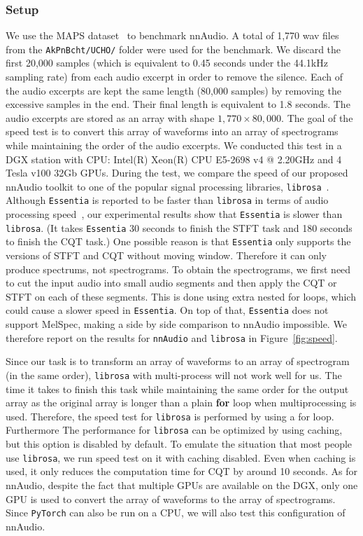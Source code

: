 \documentclass{ieeeaccess}
\newcommand{\nbh}[1]{\texttt{#1}}
\begin{document}
\subsubsection{Setup}
We use the MAPS dataset~\cite{emiya2010maps} to benchmark nnAudio. A total of 1,770 wav files from the \nbh{AkPnBcht/UCHO/} folder were used for the benchmark. We discard the first 20,000 samples (which is equivalent to 0.45 seconds under the 44.1kHz sampling rate) from each audio excerpt in order to remove the silence. Each of the audio excerpts are kept the same length (80,000 samples) by removing the excessive samples in the end. Their final length is equivalent to 1.8 seconds. The audio excerpts are stored as an array with shape $1,770 \times 80,000$. The goal of the speed test is to convert this array of waveforms into an array of spectrograms while maintaining the order of the audio excerpts. We conducted this test in a DGX station with CPU: Intel(R) Xeon(R) CPU E5-2698 v4 @ 2.20GHz and 4 Tesla v100 32Gb GPUs. During the test, we compare the speed of our proposed nnAudio toolkit to one of the popular signal processing libraries, \nbh{librosa}~\cite{mcfee2015Librosa}. Although \nbh{Essentia} is reported to be faster than \nbh{librosa} in terms of audio processing speed~\cite{moffat2015evaluation}, our experimental results show that \nbh{Essentia} is slower than \nbh{librosa}. (It takes \nbh{Essentia} 30 seconds to finish the STFT task and 180 seconds to finish the CQT task.) One possible reason is that \nbh{Essentia} only supports the versions of STFT and CQT without moving window. Therefore it can only produce spectrums, not spectrograms. To obtain the spectrograms, we first need to cut the input audio into small audio segments and then apply the CQT or STFT on each of these segments. This is done using extra nested for loops, which could cause a slower speed in \nbh{Essentia}. On top of that, \nbh{Essentia} does not support MelSpec, making a side by side comparison to nnAudio impossible. We therefore report on the results for \nbh{nnAudio} and \nbh{librosa} in Figure~\ref{fig:speed}.

Since our task is to transform an array of waveforms to an array of spectrogram (in the same order), \nbh{librosa} with multi-process will not work well for us. The time it takes to finish this task while maintaining the same order for the output array as the original array is longer than a plain \textbf{for} loop when multiprocessing is used. Therefore, the speed test for \nbh{librosa} is performed by using a for loop. Furthermore The performance for \nbh{librosa} can be optimized by using caching, but this option is disabled by default. To emulate the situation that most people use \nbh{librosa}, we run speed test on it with caching disabled. Even when caching is used, it only reduces the computation time for CQT by around 10 seconds. As for nnAudio, despite the fact that multiple GPUs are available on the DGX, only one GPU is used to convert the array of waveforms to the array of spectrograms. Since \nbh{PyTorch} can also be run on a CPU, we will also test this configuration of nnAudio. 
\end{document}
